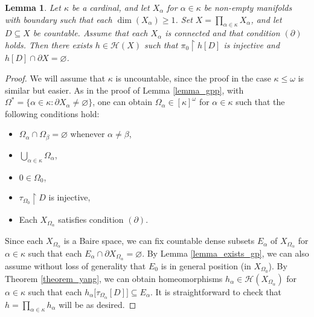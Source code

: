 \documentclass{amsart}
\theoremstyle{plain}
\newtheorem{lemma}[theorem]{Lemma}
\theoremstyle{definition}
\newcommand{\re}{\upharpoonright}
\newcommand{\HH}{\mathcal{H}}
\begin{document}
\begin{lemma}\label{lemma_gpp_manifolds_auxiliary}
Let $\kappa$ be a cardinal, and let $X_\alpha$ for $\alpha\in\kappa$ be non-empty manifolds with boundary such that each $\dim(X_\alpha)\geq 1$. Set $X=\prod_{\alpha\in\kappa}X_\alpha$, and let $D\subseteq X$ be countable. Assume that each $X_\alpha$ is connected and that condition $(\partial)$ holds. Then there exists $h\in\HH(X)$ such that $\pi_0\re h[D]$ is injective and $h[D]\cap\partial X=\varnothing$.
\end{lemma}
\begin{proof}
We will assume that $\kappa$ is uncountable, since the proof in the case $\kappa\leq\omega$ is similar but easier. As in the proof of Lemma \ref{lemma_gpp}, with $\Omega^\ast=\{\alpha\in\kappa:\partial X_\alpha\neq\varnothing\}$, one can obtain $\Omega_\alpha\in [\kappa]^\omega$ for $\alpha\in\kappa$ such that the following conditions hold:
\begin{itemize}
\item $\Omega_\alpha\cap\Omega_\beta=\varnothing$ whenever $\alpha\neq\beta$,
\item $\bigcup_{\alpha\in\kappa}\Omega_\alpha$,
\item $0\in\Omega_0$,
\item $\tau_{\Omega_0}\re D$ is injective,
\item Each $X_{\Omega_\alpha}$ satisfies condition $(\partial)$.
\end{itemize}

Since each $X_{\Omega_\alpha}$ is a Baire space, we can fix countable dense subsets $E_\alpha$ of $X_{\Omega_\alpha}$ for $\alpha\in\kappa$ such that each $E_\alpha\cap\partial X_{\Omega_\alpha}=\varnothing$. By Lemma \ref{lemma_exists_gp}, we can also assume without loss of generality that $E_0$ is in general position (in $X_{\Omega_0}$). By Theorem \ref{theorem_yang}, we can obtain homeomorphisms $h_\alpha\in\HH(X_{\Omega_\alpha})$ for $\alpha\in\kappa$ such that each $h_\alpha\big[\tau_{\Omega_\alpha}[D]\big]\subseteq E_\alpha$. It is straightforward to check that $h=\prod_{\alpha\in\kappa}h_\alpha$ will be as desired.
\end{proof}
\end{document}
